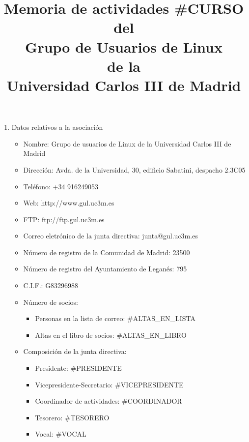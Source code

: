 \documentclass[a4paper,12pt]{report}
\title{Memoria de actividades #{CURSO}\\ del\\ Grupo de Usuarios de Linux\\ de la\\ Universidad Carlos III de Madrid}
\begin{document}
\maketitle
\begin{enumerate}
\item \textsf{\Large Datos relativos a la asociación}
\begin{itemize}
\item{Nombre:} Grupo de usuarios de Linux de la Universidad Carlos III de Madrid
\item{Dirección:} Avda. de la Universidad, 30, edificio Sabatini, despacho 2.3C05
\item{Teléfono:} +34 916249053
\item{Web:} http://www.gul.uc3m.es
\item{FTP:} ftp://ftp.gul.uc3m.es
\item{Correo eletrónico de la junta directiva:} junta@gul.uc3m.es
\item{Número de registro de la Comunidad de Madrid:} 23500
\item{Número de registro del Ayuntamiento de Leganés:} 795
\item{C.I.F.:} G83296988
\item{Número de socios:}
\begin{itemize}
\item{Personas en la lista de correo:} #{ALTAS_EN_LISTA}
\item{Altas en el libro de socios:} #{ALTAS_EN_LIBRO}
\end{itemize}
\item{Composición de la junta directiva:}
\begin{itemize}
\item{Presidente:} #{PRESIDENTE}
\item{Vicepresidente-Secretario:} #{VICEPRESIDENTE}
\item{Coordinador de actividades:} #{COORDINADOR}
\item{Tesorero:} #{TESORERO}
\item{Vocal:} #{VOCAL}
\end{itemize} 

\newpage


\end{itemize}
\end{enumerate}
\end{document}
